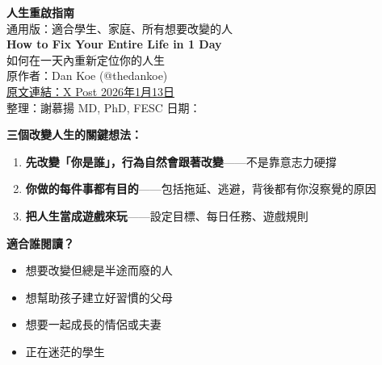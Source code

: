 \documentclass[12pt,a4paper]{article}
\begin{document}

\begin{center}
{\LARGE\bfseries\textcolor{emergency_red}{人生重啟指南}}\\[0.3cm]
{\large 通用版：適合學生、家庭、所有想要改變的人}\\[0.5cm]
{\Large\textbf{How to Fix Your Entire Life in 1 Day}}\\[0.3cm]
{\large 如何在一天內重新定位你的人生}\\[0.5cm]
{\normalsize 原作者：Dan Koe (@thedankoe)}\\[0.2cm]
{\normalsize \href{https://x.com/thedankoe/status/2010751592346030461}{原文連結：X Post 2026年1月13日}}\\[0.3cm]
{\normalsize 整理：謝慕揚 MD, PhD, FESC \quad 日期：\mydate}
\end{center}

\vspace{0.5cm}


\begin{tcolorbox}[colback=yellow!10!white,colframe=orange!75!black,title=\textbf{這篇文章在說什麼？}]
\textbf{三個改變人生的關鍵想法：}
\begin{enumerate}[leftmargin=*]
    \item \textbf{先改變「你是誰」，行為自然會跟著改變}——不是靠意志力硬撐
    \item \textbf{你做的每件事都有目的}——包括拖延、逃避，背後都有你沒察覺的原因
    \item \textbf{把人生當成遊戲來玩}——設定目標、每日任務、遊戲規則
\end{enumerate}

\textbf{適合誰閱讀？}
\begin{itemize}
    \item 想要改變但總是半途而廢的人
    \item 想幫助孩子建立好習慣的父母
    \item 想要一起成長的情侶或夫妻
    \item 正在迷茫的學生
\end{itemize}
\end{tcolorbox}

\tableofcontents
\newpage

\end{document}
